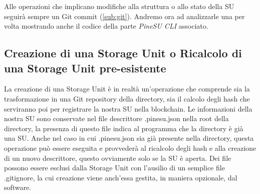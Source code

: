 Alle operazioni che implicano modifiche alla struttura o allo stato della SU seguirà sempre un Git \textsf{commit} (\autoref{sub:git}).
Andremo ora ad analizzarle una per volta mostrando anche il codice della parte \emph{PineSU CLI} associato.

\subsection{Creazione di una Storage Unit o Ricalcolo di una Storage Unit pre-esistente}
La creazione di una Storage Unit è in realtà un'operazione che comprende sia la trasformazione in una Git repository della directory, sia il calcolo degli hash che serviranno poi per registrare la nostra SU nella blockchain. Le informazioni della nostra SU sono conservate nel file descrittore \textsf{.pinesu.json} nella root della directory, la presenza di questo file indica al programma che la directory è già una SU. Anche nel caso in cui \textsf{.pinesu.json} sia già presente nella directory, questa operazione può essere eseguita e provvederà al ricalcolo degli hash e alla creazione di un nuovo descrittore, questo ovviamente solo se la SU è aperta.
Dei file possono essere esclusi dalla Storage Unit con l'ausilio di un semplice file \textsf{.gitignore}, la cui creazione viene anch'essa gestita, in maniera opzionale, dal software.

